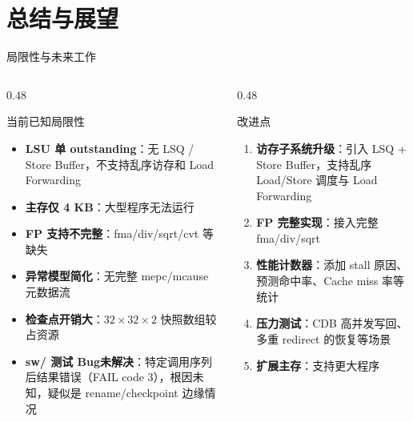 \documentclass[aspectratio=169,xcolor={dvipsnames,svgnames},10pt]{beamer}
\begin{document}
\section{总结与展望}

\begin{frame}{局限性与未来工作}
  \begin{columns}[T]
    \begin{column}{0.48\textwidth}
      \begin{alertblock}{当前已知局限性}
        \small
        \begin{itemize}
          \item \textbf{LSU 单 outstanding}：无 LSQ / Store Buffer，不支持乱序访存和 Load Forwarding
          \item \textbf{主存仅 4 KB}：大型程序无法运行
          \item \textbf{FP 支持不完整}：fma/div/sqrt/cvt 等缺失
          \item \textbf{异常模型简化}：无完整 mepc/mcause 元数据流
          \item \textbf{检查点开销大}：$32 \times 32 \times 2$ 快照数组较占资源
          \item \textbf{sw/ 测试 Bug未解决}：特定调用序列后结果错误（FAIL code 3），根因未知，疑似是 rename/checkpoint 边缘情况
        \end{itemize}
      \end{alertblock}
    \end{column}
    \begin{column}{0.48\textwidth}
      \begin{exampleblock}{改进点}
        \small
        \begin{enumerate}
          \item \textbf{访存子系统升级}：引入 LSQ + Store Buffer，支持乱序 Load/Store 调度与 Load Forwarding
          \item \textbf{FP 完整实现}：接入完整 fma/div/sqrt
          \item \textbf{性能计数器}：添加 stall 原因、预测命中率、Cache miss 率等统计
          \item \textbf{压力测试}：CDB 高并发写回、多重 redirect 的恢复等场景
          \item \textbf{扩展主存}：支持更大程序
        \end{enumerate}
      \end{exampleblock}
    \end{column}
  \end{columns}
\end{frame}
\end{document}
